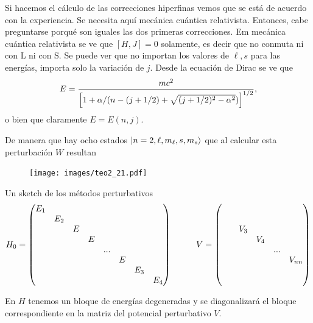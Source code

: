 \documentclass[10pt,oneside]{CBFT_book}
\begin{document}
 Si hacemos el cálculo de las correcciones hiperfinas vemos que se está de acuerdo con la experiencia.
 Se necesita aquí mecánica cuántica relativista.
 Entonces, cabe preguntarse porqué son iguales las dos primeras correcciones. Em mecánica cuántica
 relativista se ve que $ [ H, J ] = 0 $ solamente, es decir que no conmuta ni con L ni con S.
 Se puede ver que no importan los valores de $\ell,s$ para las energías, importa solo la variación
 de $j$. Desde la ecuación de Dirac se ve que 
 \[
	E = \frac{ m c^2 }{ \left[ 1 + \alpha/(n - (j+1/2) + \sqrt{(j+1/2)^2 - \alpha^2 }) \right]^{1/2} },
 \]
 o bien que claramente $E = E(n,j)$.
 
De manera que hay ocho estados $\Ket{n=2,\ell,m_\ell,s,m_s}$ que al calcular esta perturbación $W$
resultan 
\begin{figure}[htb]
	\begin{center}
	\texttt{[image: images/teo2\_21.pdf]}
	\end{center}
	\caption{}
\end{figure} 


Un sketch de los métodos perturbativos
\[
	H_0 = \begin{pmatrix}
	       E_1 & \\
	       & E_2 & \\
	       & & E \\
	       & & & E\\
	       & & & & ...\\
	       & & & & & E\\
	       & & & & & & E_3\\
	       & & & & & & & E_4
	      \end{pmatrix}
	      \hspace*{10mm}
	      V =
		\begin{pmatrix}
		& \\
		& \\
		& & V_3 \\
		& & & V_4 \\
		& & & & ... \\
		& & & & & V_{nn} \\
		& \\
		& 
		\end{pmatrix}
\]

En $H$ tenemos un bloque de energías degeneradas y se diagonalizará el bloque 
correspondiente en la matriz del potencial perturbativo $V$.






\end{document}
